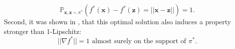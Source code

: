 \documentclass{article}
\begin{document}
\begin{equation}
\label{eq:transport_cost}
\mathbb{P}_{\textbf{x},\textbf{z}\sim \pi^*}(f^*(\textbf{x})-f^*(\textbf{z})=||\textbf{x}-\textbf{z}||)=1.
\end{equation}
 Second, it was shown in \cite{gulrajani2017improved,pmlr-v97-anil19a}, that this optimal solution also induces a property stronger  than 1-Lipschitz:
\begin{equation}
\label{eq:nabla_1}
||\nabla f^* ||=1 \text{ almost surely on the support of }\pi^*.
\end{equation}
\end{document}
